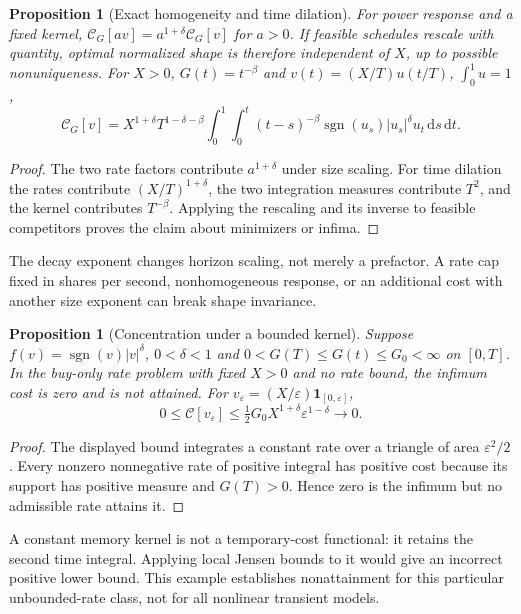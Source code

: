 \documentclass[11pt]{article}
\numberwithin{equation}{section}
\newtheorem{proposition}[theorem]{Proposition}
\theoremstyle{definition}
\theoremstyle{remark}
\theoremstyle{definition}
\newcommand{\dd}{\,\mathrm d}
\begin{document}
\begin{proposition}[Exact homogeneity and time dilation]\label{prop:nonlinearscaling}
For power response and a fixed kernel,
$\mathcal C_G[av]=a^{1+\delta}\mathcal C_G[v]$ for $a>0$.
If feasible schedules rescale with quantity, optimal normalized shape is
therefore independent of $X$, up to possible nonuniqueness.
For $X>0$, $G(t)=t^{-\beta}$ and $v(t)=(X/T)u(t/T)$, $\int_0^1u=1$,
\begin{equation}\label{eq:nonlinearscale}
 \mathcal C_G[v]=X^{1+\delta}T^{1-\delta-\beta}
 \int_0^1\int_0^t(t-s)^{-\beta}
       \operatorname{sgn}(u_s)|u_s|^\delta u_t\dd s\dd t.
\end{equation}
\end{proposition}
\begin{proof}
The two rate factors contribute $a^{1+\delta}$ under size scaling. For time
dilation the rates contribute $(X/T)^{1+\delta}$, the two integration measures
contribute $T^2$, and the kernel contributes $T^{-\beta}$. Applying the
rescaling and its inverse to feasible competitors proves the claim about
minimizers or infima.
\end{proof}
The decay exponent changes horizon scaling, not merely a prefactor. A rate
cap fixed in shares per second, nonhomogeneous response, or an additional cost
with another size exponent can break shape invariance.

\begin{proposition}[Concentration under a bounded kernel]\label{prop:concentration}
Suppose $f(v)=\operatorname{sgn}(v)|v|^\delta$, $0<\delta<1$ and
$0<G(T)\leq G(t)\leq G_0<\infty$ on $[0,T]$. In the buy-only
rate problem with fixed $X>0$ and no rate bound, the infimum cost is zero and
is not attained. For $v_\varepsilon=(X/\varepsilon)\mathbf1_{[0,\varepsilon]}$,
\[
 0\leq\mathcal C[v_\varepsilon]
 \leq\tfrac12G_0X^{1+\delta}\varepsilon^{1-\delta}\longrightarrow0.
\]
\end{proposition}
\begin{proof}
The displayed bound integrates a constant rate over a triangle of area
$\varepsilon^2/2$. Every nonzero nonnegative rate of positive integral has
positive cost because its support has positive measure and $G(T)>0$.
Hence zero is the infimum but no admissible rate attains it.
\end{proof}
A constant memory kernel is not a temporary-cost functional: it retains the
second time integral. Applying local Jensen bounds to it would give an
incorrect positive lower bound. This example establishes nonattainment for
this particular unbounded-rate class, not for all nonlinear transient models.
\end{document}
